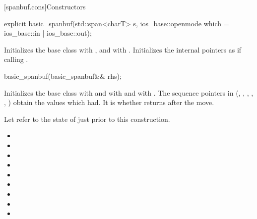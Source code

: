 [spanbuf.cons]{Constructors}

%
\begin{itemdecl}
explicit basic_spanbuf(std::span<charT> s,
                       ios_base::openmode which = ios_base::in | ios_base::out);
\end{itemdecl}

\begin{itemdescr}
\pnum
\effects
Initializes the base class with ,
and  with .
Initializes the internal pointers as if calling .
\end{itemdescr}

%
\begin{itemdecl}
basic_spanbuf(basic_spanbuf&& rhs);
\end{itemdecl}

\begin{itemdescr}
\pnum
\effects
Initializes the base class with  and
 with  and
 with .
The sequence pointers in 
(, , ,
, , )
obtain the values which  had.
It is
whether  returns  after the move.

\pnum
\ensures
Let  refer to the state of 
just prior to this construction.
\begin{itemize}
\item {}
\item {}
\item {}
\item {}
\item {}
\item {}
\item {}
\item {}
\item {}
\end{itemize}
\end{itemdescr}

